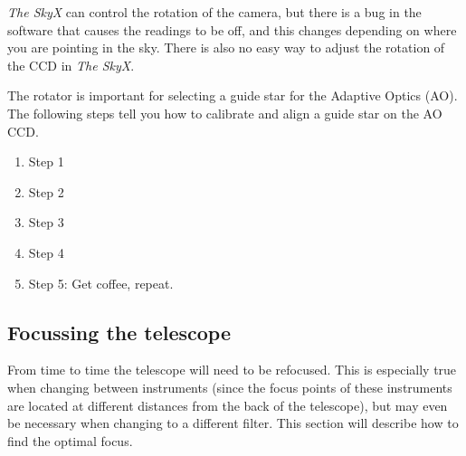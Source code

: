 \documentclass[12pt,twoside,a4paper]{report}
\begin{document}

\emph{The SkyX} can control the rotation of the camera, but there is a bug in the software that causes the readings to be off, and this changes depending on where you are pointing in the sky. There is also no easy way to adjust the rotation of the CCD in \emph{The SkyX}.\\

\clearpage

The rotator is important for selecting a guide star for the Adaptive Optics (AO). The following steps tell you how to calibrate and align a guide star on the AO CCD.
\begin{enumerate}
 \item Step 1
 \item Step 2
 \item Step 3
 \item Step 4
 \item Step 5: Get coffee, repeat.
\end{enumerate}


\subsection{Focussing the telescope}
\label{focussing}

From time to time the telescope will need to be refocused. This is especially true when changing between instruments (since the focus points of these instruments are located at different distances from the back of the telescope), but may even be necessary when changing to a different filter. This section will describe how to find the optimal focus.
\end{document}
